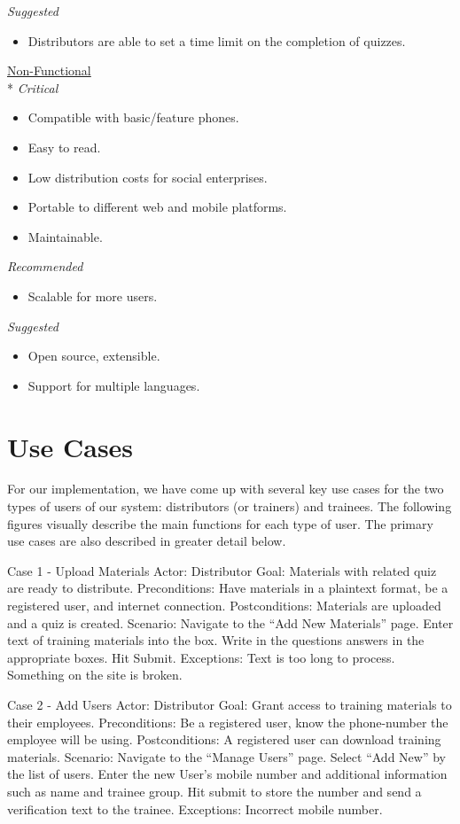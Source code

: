 \textit{Suggested}
\begin{itemize}
\item Distributors are able to set a time limit on the completion of quizzes.\\
\end{itemize}

\underline{Non-Functional}\\*
\textit{Critical}
\begin{itemize}
\item Compatible with basic/feature phones.
\item Easy to read.
\item Low distribution costs for social enterprises.
\item Portable to different web and mobile platforms.
\item Maintainable.
\end{itemize}

\textit{Recommended}
\begin{itemize}
\item Scalable for more users.
\end{itemize}

\textit{Suggested}
\begin{itemize}
\item Open source, extensible.
\item Support for multiple languages.
\end{itemize}

\section{Use Cases}
For our implementation, we have come up with several key use cases for the two types of users of our system: distributors (or trainers) and trainees. The following figures visually describe the main functions for each type of user. The primary use cases are also described in greater detail below.

Case 1 - Upload Materials
Actor: Distributor
Goal: Materials with related quiz are ready to distribute.
Preconditions: Have materials in a plaintext format, be a registered user, and internet connection.
Postconditions: Materials are uploaded and a quiz is created.
Scenario: 
Navigate to the “Add New Materials” page.
Enter text of training materials into the box.
Write in the questions answers in the appropriate boxes.
Hit Submit.
Exceptions:
Text is too long to process.
Something on the site is broken.

Case 2 - Add Users
Actor: Distributor
Goal: Grant access to training materials to their employees.
Preconditions: Be a registered user, know the phone-number the employee will be using.
Postconditions: A registered user can download training materials.
Scenario:
Navigate to the “Manage Users” page.
Select “Add New” by the list of users.
Enter the new User’s mobile number and additional information such as name and trainee group.
Hit submit to store the number and send a verification text to the trainee.
Exceptions: 
Incorrect mobile number.

